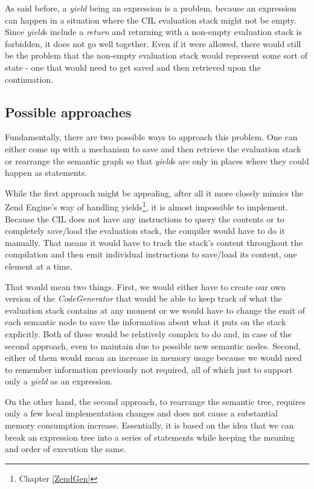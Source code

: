 As said before, a \emph{yield} being an expression is a problem, because an expression can happen in a situation where the CIL evaluation stack might not be empty. Since \emph{yield}s include a \emph{return} and returning with a non-empty evaluation stack is forbidden, it does not go well together. Even if it were allowed, there would still be the problem that the non-empty evaluation stack would represent some sort of state - one that would need to get saved and then retrieved upon the continuation.

\subsection{Possible approaches}

Fundamentally, there are two possible ways to approach this problem. One can either come up with a mechanism to save and then retrieve the evaluation stack or rearrange the semantic graph so that \emph{yield}s are only in places where they could happen as statements.

While the first approach might be appealing, after all it more closely mimics the Zend Engine’s way of handling yields\footnote{Chapter \ref{ZendGen}}, it is almost impossible to implement. Because the CIL does not have any instructions to query the contents or to completely save/load the evaluation stack, the compiler would have to do it manually. That means it would have to track the stack’s content throughout the compilation and then emit individual instructions to save/load its content, one element at a time.

That would mean two things. First, we would either have to create our own version of the \emph{CodeGenerator} that would be able to keep track of what the evaluation stack contains at any moment or we would have to change the emit of each semantic node to save the information about what it puts on the stack explicitly. Both of these would be relatively complex to do and, in case of the second approach, even to maintain due to possible new semantic nodes. Second, either of them would mean an increase in memory usage because we would need to remember information previously not required, all of which just to support only a \emph{yield} as an expression. 

On the other hand, the second approach, to rearrange the semantic tree, requires only a few local implementation changes and does not cause a substantial memory consumption increase. Essentially, it is based on the idea that we can break an expression tree into a series of statements while keeping the meaning and order of execution the same.

